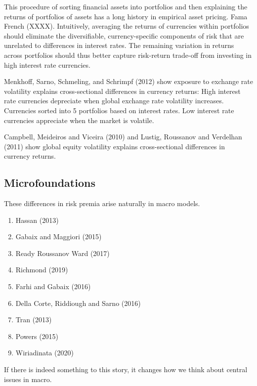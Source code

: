 \documentclass[12pt,letter]{article}
\theoremstyle{break} \theorembodyfont{\normalfont\itshape}
\theoremstyle{break}
\theoremstyle{break} \theorembodyfont{\normalfont\itshape}
\theoremstyle{break} \theorembodyfont{\normalfont\itshape}
\begin{document}
This procedure of sorting financial assets into portfolios and then explaining the returns of portfolios of assets has a long history in empirical asset pricing. Fama French (XXXX). Intuitively, averaging the returns of currencies within portfolios should eliminate the diversifiable, currency-specific components of risk that are unrelated to differences in interest rates. The remaining variation in returns across portfolios should thus better capture risk-return trade-off from investing in high interest rate currencies.

Menkhoff, Sarno, Schmeling, and Schrimpf (2012) show exposure to exchange rate volatility explains cross-sectional differences in currency returns: High interest rate currencies depreciate when global exchange rate volatility increases. Currencies sorted into 5 portfolios based on interest rates. Low interest rate currencies appreciate when the market is volatile.

Campbell, Meideiros and Viceira (2010) and Lustig, Roussanov and Verdelhan (2011) show global equity volatility explains cross-sectional differences in currency returns.  


\subsection{Microfoundations}
These differences in risk premia arise naturally in macro models.
\begin{enumerate}
\item Hassan (2013)
\item Gabaix and Maggiori (2015)
\item Ready Roussanov Ward (2017)
\item Richmond (2019)
\item Farhi and Gabaix (2016)
\item Della Corte, Riddiough and Sarno (2016)
\item Tran (2013)
\item Powers (2015)
\item Wiriadinata (2020)
\end{enumerate}



If there is indeed something to this story, it changes how we think
about central issues in macro.
\end{document}
